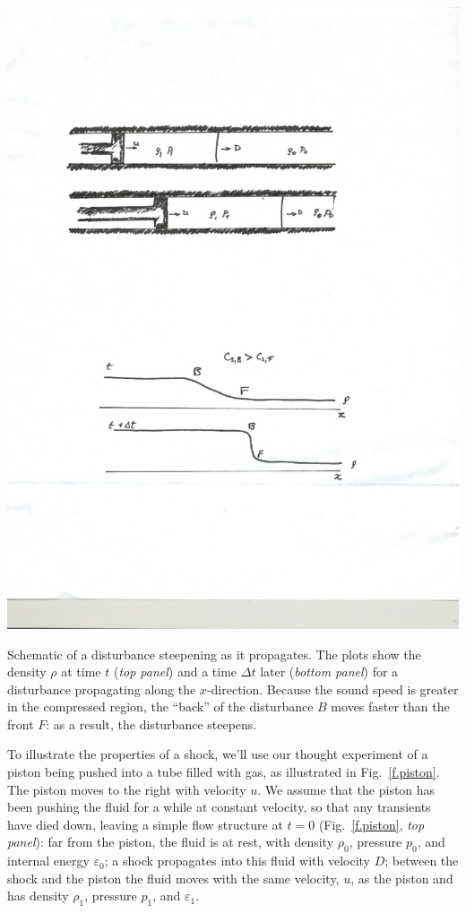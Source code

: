 \begin{marginfigure}
\includegraphics[width=\textwidth]{shock-formation}
\caption{Schematic of a disturbance steepening as it propagates.  The plots show the density $\rho$ at time $t$ (\emph{top panel}) and a time $\Delta t$ later (\emph{bottom panel}) for a disturbance propagating along the $x$-direction.  Because the sound speed is greater in the compressed region, the ``back'' of the disturbance $B$ moves faster than the front $F$: as a result, the disturbance steepens. }
\label{f.steepening}
\end{marginfigure}

To illustrate the properties of a shock, we'll use our thought experiment of a piston being pushed into a tube filled with gas, as illustrated in Fig.~\ref{f.piston}.  The piston moves to the right with velocity $u$.  We assume that the piston has been pushing the fluid for a while at constant velocity, so that any transients have died down, leaving a simple flow structure at $t=0$ (Fig.~\ref{f.piston}, \emph{top panel}): far from the piston, the fluid is at rest, with density $\rho_{0}$, pressure $p_{0}$, and internal energy $\varepsilon_{0}$; a shock propagates into this fluid with velocity $D$; between the shock and the piston the fluid moves with the same velocity, $u$, as the piston and has density $\rho_{1}$, pressure $p_{1}$, and $\varepsilon_{1}$.

